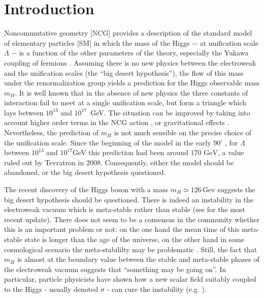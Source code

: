 \documentclass[11pt]{article}
\begin{document}
\section{Introduction}

Noncommutative geometry [NCG] provides a description of the standard model of elementary particles [SM] in
which the mass of the Higgs $-$ at unification scale $\Lambda$ $-$ is a function of the other parameters
of the theory, especially the Yukawa coupling of fermions \cite{Chamseddine:2007oz}. Assuming there is no new physics between
the electroweak and the unification scales (the ``big desert
hypothesis''),  the flow of this mass under
the renormalization group yields a prediction for the Higgs observable
mass $m_H$. It is well known that in the absence of new physics the three
constants of interaction fail to meet at a single unification
scale, but form a triangle which lays between $10^{13}$ and $10^{17}$~GeV. The situation can be improved by taking into account
higher order terms in the NCG action \cite{spectral-action-order6}, or
gravitational effects \cite{Agostino-grav}. Nevertheless, the
prediction of $m_H$ is not much sensible on the precise choice of the unification scale. Since the beginning of the model in the
early 90' \cite{Connes:1990ix, Connes:1996fu}, for $\Lambda$ between
$10^{13}$ and $10^{17}$GeV 
this prediction had
been around $170\text{ GeV}$, a value ruled out by Tevratron in
2008. Consequently, either the model should be abandoned, or the big desert hypothesis questioned.

The recent discovery of the Higgs boson with a mass $m_H\simeq 126
\,\text{Gev}$ suggests the big desert hypothesis should be
questioned. There is indeed an instability in the electroweak vacuum which is meta-stable rather than
stable (see \cite{near-critic} for the most recent update). There does
not seem to be a consensus in
the community whether this is an important problem or not: on the one
hand the
mean time of this meta-stable state is longer than the age of the
universe, on the other hand in some cosmological scenario the
meta-stabililty may be problematic \cite{cosmohiggs, Higgscosmoprocee}. Still, the fact that $m_H$ is almost
at the boundary value between the stable and meta-stable phases of the
electroweak vacuum suggests that ``something may be going on''. In
particular, particle physicists have shown how a
new scalar field  suitably coupled to the Higgs - usually
denoted $\sigma$ - can cure the
instability (e.g. \cite{C.-S.-Chen:2012vn,Elias-Miro:2012ys}).  
\end{document}
